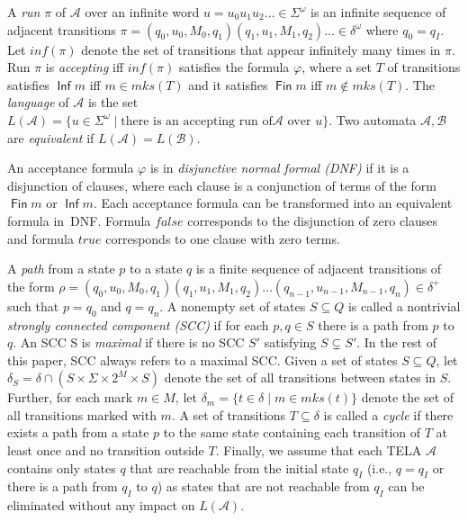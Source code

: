 \documentclass[runningheads]{llncs}
\newcommand{\todo}[1]{\marginpar{\textcolor{red}{#1}}}
\DeclareMathOperator{\Inf}{\mathsf{Inf}}
\DeclareMathOperator{\Fin}{\mathsf{Fin}}
\newcommand{\minf}{\mathit{inf}}
\newcommand{\mks}{\mathit{mks}}
\def\false{\mathit{false}}
\def\true{\mathit{true}}
\newcommand{\mA}{\mathcal{A}}
\newcommand{\mB}{\mathcal{B}}
\begin{document}
A \emph{run} $\pi$ of $\mA$ over an infinite word
$u = u_{0}u_{1}u_{2}\ldots \in \Sigma^{\omega}$ is an infinite sequence
of adjacent transitions
$\pi=(q_0,u_0,M_0,q_1)(q_1,u_1,M_1,q_2)\ldots\in\delta^{\omega}$ where
$q_0=q_I$. Let $\minf(\pi)$ denote the set of transitions that appear
infinitely many times in $\pi$. Run $\pi$ is \emph{accepting} iff
$\minf(\pi)$ satisfies the formula $\varphi$, where a set $T$ of
transitions satisfies $\Inf m$ iff $m\in\mks(T)$ and it satisfies
$\Fin m$ iff $m\not\in\mks(T)$. The \emph{language} of $\mA$ is
the set
$L(\mA)=\{u\in \Sigma^{\omega}\mid\textrm{there is an accepting run of
}\mA\textrm{ over }u\}$. Two automata $\mA,\mB$ are \emph{equivalent}
if $L(\mA)=L(\mB)$.

An acceptance formula $\varphi$ is in \emph{disjunctive normal formal
  (DNF)} if it is a disjunction of clauses, where each clause is a
conjunction of terms of the form $\Fin m$ or $\Inf m$.  Each
acceptance formula can be transformed into an equivalent formula
in~DNF. Formula $\false$ corresponds to the disjunction of zero
clauses and formula $\true$ corresponds to one clause with zero terms.

A \emph{path} from a state $p$ to a state $q$ is a finite sequence of
adjacent transitions of the form
$\rho=(q_0,u_0,M_0,q_1)(q_1,u_1,M_1,q_2)\ldots(q_{n-1},u_{n-1},M_{n-1},q_n)\in\delta^+$
such that $p=q_0$ and $q=q_n$. A nonempty set of states $S\subseteq Q$
is called a nontrivial \emph{strongly connected component (SCC)} if
for each $p,q\in S$ there is a path from $p$ to $q$. An SCC S is
\emph{maximal} if there is no SCC $S'$ satisfying $S\subsetneq S'$. In
the rest of this paper, SCC always refers to a maximal SCC. Given a
set of states $S\subseteq Q$, let $\delta_S=\delta\cap (S\times \Sigma \times 2^M \times S)$
denote the set of all transitions between states in $S$. Further, for
each mark $m\in M$, let $\delta_m=\{t\in\delta\mid m\in
\mks(t)\}$ denote the set of all transitions
marked with $m$.
A set of transitions $T\subseteq\delta$ is called a \emph{cycle} if
there exists a path from a state $p$ to the same state containing each
transition of $T$ at least once and no transition outside
$T$. Finally, we assume that each TELA $\mA$ contains only states $q$
that are reachable from the initial state $q_I$ (i.e., $q=q_I$ or
there is a path from $q_I$ to $q$) as states that are not reachable
from $q_I$ can be eliminated without any impact on $L(\mA)$.
\end{document}
